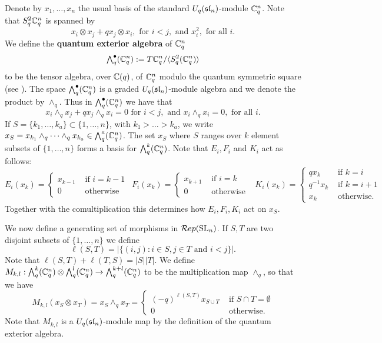 \documentclass[11pt]{amsart}
\begin{document}
Denote by $ x_1, \dots, x_n $ the usual basis of the standard $U_q(\sl_n)$-module $\bC_q^n $. Note that $S^2_q \bC_q^n $ is spanned by
$$ x_i \otimes x_j + q x_j \otimes x_i, \text{ for }  i < j , \text{ and } x_i^2, \text{ for all } i. $$
We define the {\bf quantum exterior algebra} of $ \bC_q^n $
$$  \Alt{\bullet}{q}(\bC_q^n) := T \bC_q^n / \langle S^2_q ( \bC_q^n) \rangle $$
to be the tensor algebra, over $\bC(q) $, of $ \bC_q^n $ modulo the quantum symmetric square (see \cite{BZ}). The space $ \Alt{\bullet}{q}(\bC_q^n) $ is a graded $U_q(\sl_n)$-module algebra and we denote the product by $ \wedge_q $. Thus in $ \Alt{\bullet}{q}(\bC_q^n) $ we have that
$$ x_i \wedge_q x_j + q x_j \wedge_q x_i = 0 \text{ for }  i < j, \text{ and } x_i \wedge_q x_i = 0, \text{ for all }  i. $$
If $ S =\{k_1, \dots, k_a\} \subset \{1, \dots, n\} $, with $ k_1 > \dots > k_a $, we write $ x_S = x_{k_1} \wedge_q \cdots \wedge_q x_{k_a} \in \Alt{a}{q}(\bC_q^n) $. The set $ x_S $ where $ S $ ranges over $ k $ element subsets of $ \{1, \dots, n \} $ forms a basis for $ \Alt{k}{q}(\bC_q^n) $. Note that $E_i, F_i$ and $K_i$ act as follows:
$$E_i(x_k) = \begin{cases} x_{k-1} & \text{ if } i=k-1 \\ 0 & \text{ otherwise } \end{cases} \ \
F_i(x_k) = \begin{cases} x_{k+1} & \text{ if } i=k \\ 0 & \text{ otherwise } \end{cases} \ \
K_i(x_k) = \begin{cases} qx_k & \text{ if } k = i \\ q^{-1} x_k & \text{ if } k=i+1 \\ x_k & \text{ otherwise. } \end{cases}$$
Together with the comultiplication this determines how $E_i,F_i,K_i$ act on $x_S$.

We now define a generating set of morphisms in $\Rep(\SL_n)$. If $S, T$ are two disjoint subsets of $ \{1, \dots, n\} $ we define $$ \ell(S, T) = |\{ (i,j) : i \in S, j \in T \text{ and } i < j \}|. $$ Note that $\ell(S,T) + \ell(T,S) = |S||T| $. We define $ M_{k,l} : \Alt{k}{q} (\bC^n_q) \otimes \Alt{l}{q}(\bC^n_q) \rightarrow \Alt{k+l}{q}(\bC^n_q) $ to be the multiplication map $ \wedge_q $, so that we have
\begin{equation*}
M_{k,l}(x_S \otimes x_T) = x_S \wedge_q x_T = \begin{cases} (-q)^{\ell(S, T)} x_{S \cup T} & \text{ if } S \cap T = \emptyset \\
 0 & \text{ otherwise. }
 \end{cases}
\end{equation*}
Note that $ M_{k,l} $ is a $ U_q(\sl_n)$-module map by the definition of the quantum exterior algebra.
\end{document}

